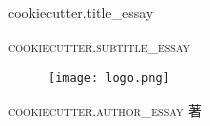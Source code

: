 \begin{titlepage}

  \begin{center}


    {
      \fontsize{60pt}{70pt}\selectfont
      \textcolor{titlecolor}
        {
          {{cookiecutter.title_essay}}
	}
	\\[2cm]
    }

    \textsc{\huge
	  {{cookiecutter.subtitle_essay}}
    }
    \\[4cm]

    \begin{figure}[h]
      \centering
      \texttt{[image: logo.png]}
    \end{figure}

    \vspace{1.5cm}

    \textsc{\Large
      {{cookiecutter.author_essay}} 著
    }

  \end{center}
\end{titlepage}
